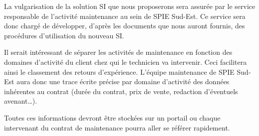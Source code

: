 La \og vulgarisation \fg de la solution SI que nous proposerons sera assurée par le service responsable de l'activité maintenance au sein de SPIE Sud-Est. Ce service sera donc chargé de développer, d'après les documents que nous auront fournis, des procédures d'utilisation du nouveau SI.

Il serait intéressant de séparer les activités de maintenance en fonction des domaines d'activité du client chez qui le technicien va intervenir. Ceci facilitera ainsi le classement des retours d'expérience. L'équipe maintenance de SPIE Sud-Est aura donc une trace écrite précise par domaine d'activité des données inhérentes au contrat (durée du contrat, prix de vente, redaction d'éventuels avenant…).

Toutes ces informations devront être stockées sur un portail ou chaque intervenant du contrat de maintenance pourra aller se référer rapidement.
